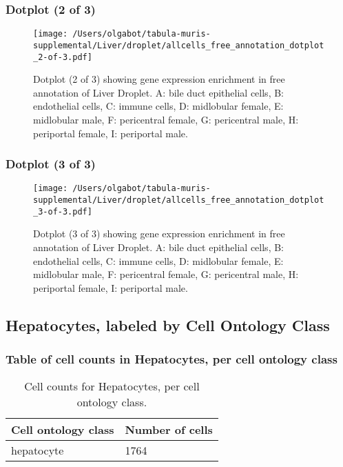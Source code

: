 \subsubsection{Dotplot (2 of 3)}
\begin{figure}[h]
\centering
\texttt{[image: /Users/olgabot/tabula-muris-supplemental/Liver/droplet/allcells\_free\_annotation\_dotplot\_2-of-3.pdf]}

\caption{ Dotplot (2 of 3)  showing gene expression enrichment in free annotation of Liver Droplet. A: bile duct epithelial cells, B: endothelial cells, C: immune cells, D: midlobular female, E: midlobular male, F: pericentral female, G: pericentral male, H: periportal female, I: periportal male.}
\end{figure}


\clearpage
\clearpage
\subsubsection{Dotplot (3 of 3)}
\begin{figure}[h]
\centering
\texttt{[image: /Users/olgabot/tabula-muris-supplemental/Liver/droplet/allcells\_free\_annotation\_dotplot\_3-of-3.pdf]}

\caption{ Dotplot (3 of 3)  showing gene expression enrichment in free annotation of Liver Droplet. A: bile duct epithelial cells, B: endothelial cells, C: immune cells, D: midlobular female, E: midlobular male, F: pericentral female, G: pericentral male, H: periportal female, I: periportal male.}
\end{figure}


\clearpage
\subsection{Hepatocytes, labeled by Cell Ontology Class}
\subsubsection{Table of cell counts in Hepatocytes, per cell ontology class}\begin{table}[h]
\centering
\label{my-label}
\begin{tabular}{@{}ll@{}}
\toprule

Cell ontology class& Number of cells \\ \midrule
hepatocyte & 1764 \\
\bottomrule
\end{tabular}
\caption{Cell counts for Hepatocytes, per cell ontology class.}
\end{table}

